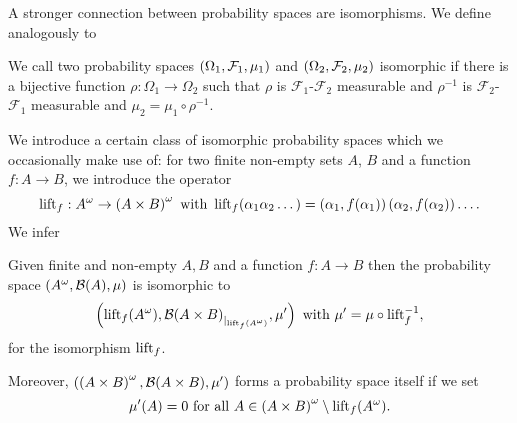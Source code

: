 A stronger connection between probability spaces are isomorphisms. We define
analogously to \cite[Definition 8.34]{Klenke}
\begin{definition}
  We call two probability spaces $\left(\Omega_{1}, \mathcal{F}_{1}, \mu_{1}\right)$
  and $\left(\Omega_{2}, \mathcal{F}_{2}, \mu_{2}\right)$ isomorphic if there is a
  bijective function $\rho:\Omega_{1}\rightarrow\Omega_{2}$ such that
  $\rho$ is $\mathcal{F}_{1}$-$\mathcal{F}_{2}$ measurable and $\rho^{-1}$ is
  $\mathcal{F}_{2}$-$\mathcal{F}_{1}$ measurable and 
  $\mu_{2} = \mu_{1}\circ\rho^{-1}$.
\end{definition}
We introduce a certain class of isomorphic probability spaces which we 
occasionally make use of: for two finite non-empty sets $A$, $B$ and
a function $f:A\rightarrow B$, we introduce the operator
\begin{equation*}
  \operatorname{lift}_{f}:A^{\omega}\rightarrow\left(A\times B\right)^{\omega}
  \text{ with }\operatorname{lift}_{f}(\alpha_{1}\alpha_{2}\dots) = 
    \left(\alpha_{1}, f(\alpha_{1})\right)\left(\alpha_{2}, f(\alpha_{2})\right)\dots.
\end{equation*}
We infer
\begin{lemma}
  Given finite and non-empty $A, B$ and a function $f:A\rightarrow B$ then the
  probability space $\left(A^{\omega}, \mathcal{B}(A), \mu\right)$ is isomorphic to
  \begin{equation*}
    \left(\operatorname{lift}_{f}(A^{\omega}), 
      {\mathcal{B}(A\times B)}_{|_{\operatorname{lift}_{f}(A^{\omega})}}, \mu'
    \right) \text{ with } \mu' = \mu\circ\operatorname{lift}_{f}^{-1},
  \end{equation*}
  for the isomorphism $\operatorname{lift}_{f}$.

  Moreover, $\left(\left(A\times B\right)^{\omega}, \mathcal{B}(A\times B),
  \mu'\right)$ forms a probability space itself if we set
  \begin{equation*}
    \mu'(A) = 0\text{ for all }A\in
    \left(A\times B\right)^{\omega}\setminus\operatorname{lift}_{f}(A^{\omega}).
  \end{equation*}
  \label{lem:liftisomorphism}
\end{lemma}
